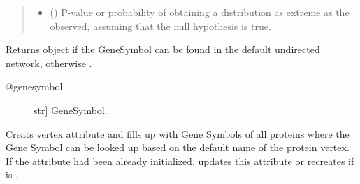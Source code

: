 \documentclass[letterpaper,10pt,english]{sphinxmanual}
\begin{document}
\begin{fulllineitems}
\begin{fulllineitems}
\begin{quote}
\begin{description}
\begin{itemize}
\item {} 
() \textendash{} P-value or probability of obtaining a
distribution as extreme as the observed, assuming that the
null hypothesis is true.

\end{itemize}


\end{description}\end{quote}

\end{fulllineitems}


\begin{fulllineitems}
\label{\detokenize{main:pypath.main.PyPath.geneset_enrichment}}
\end{fulllineitems}


\begin{fulllineitems}
\label{\detokenize{main:pypath.main.PyPath.genesymbol}}
Returns  object if the GeneSymbol
can be found in the default undirected network,
otherwise .
\begin{description}
\item[{@genesymbol}] \leavevmode{[}str{]}
GeneSymbol.

\end{description}

\end{fulllineitems}


\begin{fulllineitems}
\label{\detokenize{main:pypath.main.PyPath.genesymbol_labels}}
Creats vertex attribute  and fills up with Gene Symbols
of all proteins where the Gene Symbol can be looked up based on
the default name of the protein vertex.
If the attribute  had been already initialized,
updates this attribute or recreates if 
is .


\end{fulllineitems}
\end{fulllineitems}
\end{document}
